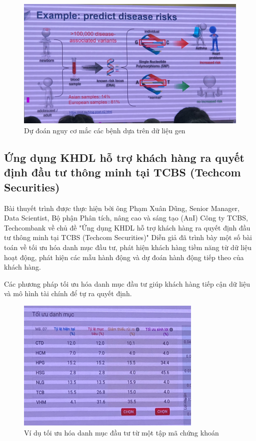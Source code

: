 \documentclass[14pt, a4paper]{article}
\numberwithin{equation}{section}
\numberwithin{figure}{section}
\numberwithin{dl}{section}
\numberwithin{md}{section}
\numberwithin{bd}{section}
\numberwithin{dn}{section}
\numberwithin{hq}{section}
\begin{document}
    \begin{figure}[h!]
        \centering
        \includegraphics{predict-disease-risk.png}
        \caption{Dự đoán nguy cơ mắc các bệnh dựa trên dữ liệu gen}
    \end{figure}

    \subsection{Ứng dụng KHDL hỗ trợ khách hàng ra quyết định đầu tư thông minh tại TCBS (Techcom Securities)}

    Bài thuyết trình được thực hiện bởi ông Phạm Xuân Dũng, Senior Manager, Data Scientist, Bộ phận Phân tích, nâng cao và sáng tạo (AnI) Công ty TCBS, Techcombank về chủ đề "Ứng dụng KHDL hỗ trợ khách hàng ra quyết định đầu tư thông minh tại TCBS (Techcom Securities)"
    Diễn giả đã trình bày một số bài toán về tối ưu hóa danh mục đầu tư, phát hiện khách hàng tiềm năng từ dữ liệu hoạt động, phát hiện các mẫu hành động và dự đoán hành động tiếp theo của khách hàng.

    Các phương pháp tối ưu hóa danh mục đầu tư giúp khách hàng tiếp cận dữ liệu và mô hình tài chính để tự ra quyết định.

    \begin{figure}
        \centering
        \includegraphics{Portfolio_Optimization.png}
        \caption{Ví dụ tối ưu hóa danh mục đầu tư từ một tập mã chứng khoán}
    \end{figure}
\end{document}
